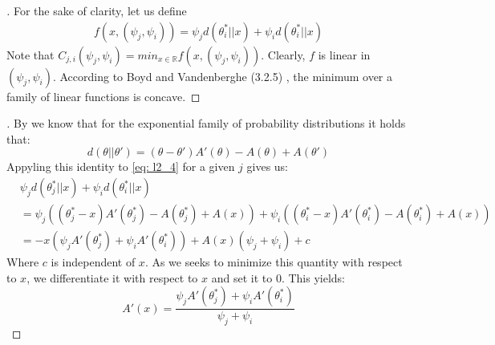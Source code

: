 \begin{proof}[]
  For the sake of clarity, let us define
  \begin{align}
    f(x, (\psi_j, \psi_i)) = \psi_j d(\theta_i^*||x) + \psi_i d(\theta_i^* || x)
  \end{align}
  Note that $C_{j, i}(\psi_j, \psi_i) = min_{x \in \mathbb{R}} f(x,(\psi_j, \psi_i))$. Clearly, $f$ is linear in $(\psi_j, \psi_i)$. According to Boyd and Vandenberghe (3.2.5) \cite{Boyd:2004:CO:993483}, the minimum over a family of linear functions is concave.
\end{proof}

\begin{proof}[]
  By  we know that for the exponential family of probability distributions it holds that:
  \[d(\theta||\theta') = (\theta - \theta')A'(\theta) - A(\theta) + A(\theta')\]
  Appyling this identity to \eqref{eq: l2_4} for a given $j$ gives us:
  \begin{align}
    &\psi_{j}d(\theta^*_{j} || x) + \psi_{i}d(\theta_{i}^* ||x) \\
    &=\psi_j ((\theta_j^* - x)A'(\theta_j^*) - A(\theta_j^*) + A(x)) + \psi_i((\theta_i^* - x)A'(\theta_i^*) - A(\theta_i^*) + A(x))\\
    &= -x(\psi_j A'(\theta_j^*) + \psi_i A'(\theta_i^*)) + A(x)(\psi_j + \psi_i) + c
  \end{align}
  Where $c$ is independent of $x$. As we seeks to minimize this quantity with respect to $x$, we differentiate it with respect to $x$ and set it to 0. This yields:
  \[A'(x) = \frac{\psi_j A'(\theta_j^*) + \psi_i A'(\theta_i^*)}{\psi_j + \psi_i}\]
\end{proof}

